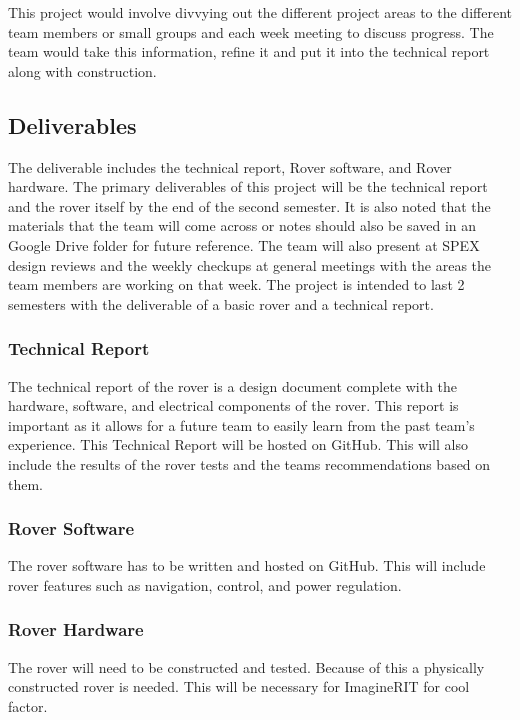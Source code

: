 \documentclass[conference]{IEEEtran} %
\begin{document}
This project would involve divvying out the different project areas to the different team members or small groups and each week meeting to discuss progress. 
The team would take this information, refine it and put it into the technical report along with construction.  

\subsection{Deliverables}
\label{subsec:deliverables}

The deliverable includes the technical report, Rover software, and Rover hardware.
The primary deliverables of this project will be the technical report and the rover itself by the end of the second semester.
It is also noted that the materials that the team will come across or notes should also be saved in an Google Drive folder for future reference. 
The team will also present at SPEX design reviews and the weekly checkups at general meetings with the areas the team members are working on that week.
The project is intended to last 2 semesters with the deliverable of a basic rover and a technical report.   

\subsubsection{Technical Report}
\label{techreport}

The technical report of the rover is a design document complete with the hardware, software, and electrical components of the rover. This report is important as it allows for a future team to easily learn from the past team's experience. This Technical Report will be hosted on GitHub. This will also include the results of the rover tests and the teams recommendations  based on them. 

\subsubsection{Rover Software}
\label{roversoftware}
The rover software has to be written and hosted on GitHub. This will include rover features such as navigation, control, and power regulation. 

\subsubsection{Rover Hardware}
\label{roverhardware}
The rover will need to be constructed and tested. Because of this a physically constructed rover is needed. This will be necessary for ImagineRIT for cool factor. 
\end{document}
